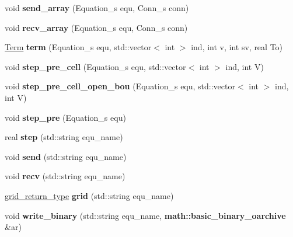 \begin{DoxyCompactItemize}
\item 
\hypertarget{classFace_afdbbc9947c0d7cd84b427bd7b503b15b}{void {\bfseries send\+\_\+array} (Equation\+\_\+s equ, Conn\+\_\+s conn)}\label{classFace_afdbbc9947c0d7cd84b427bd7b503b15b}

\item 
\hypertarget{classFace_a57bdfcf1ebf5e208b611f98b7ddeca00}{void {\bfseries recv\+\_\+array} (Equation\+\_\+s equ, Conn\+\_\+s conn)}\label{classFace_a57bdfcf1ebf5e208b611f98b7ddeca00}

\item 
\hypertarget{classFace_aa827a7d26d1b90507bb4252830b3ecf5}{\hyperlink{structTerm}{Term} {\bfseries term} (Equation\+\_\+s equ, std\+::vector$<$ int $>$ ind, int v, int sv, real To)}\label{classFace_aa827a7d26d1b90507bb4252830b3ecf5}

\item 
\hypertarget{classFace_aba0d776b0f0e7cceee8729825347b5cc}{void {\bfseries step\+\_\+pre\+\_\+cell} (Equation\+\_\+s equ, std\+::vector$<$ int $>$ ind, int V)}\label{classFace_aba0d776b0f0e7cceee8729825347b5cc}

\item 
\hypertarget{classFace_a2bafbcce9f57fd3bdefd9f23a62c853d}{void {\bfseries step\+\_\+pre\+\_\+cell\+\_\+open\+\_\+bou} (Equation\+\_\+s equ, std\+::vector$<$ int $>$ ind, int V)}\label{classFace_a2bafbcce9f57fd3bdefd9f23a62c853d}

\item 
\hypertarget{classFace_a8af2298846b8a666332f00de91796844}{void {\bfseries step\+\_\+pre} (Equation\+\_\+s equ)}\label{classFace_a8af2298846b8a666332f00de91796844}

\item 
\hypertarget{classFace_a62a7d504c1e99dfc928b7e27b544893b}{real {\bfseries step} (std\+::string equ\+\_\+name)}\label{classFace_a62a7d504c1e99dfc928b7e27b544893b}

\item 
\hypertarget{classFace_a781b3843f33507116afa741579317e83}{void {\bfseries send} (std\+::string equ\+\_\+name)}\label{classFace_a781b3843f33507116afa741579317e83}

\item 
\hypertarget{classFace_a4c67c45fa975e6fb3bc3d4ee0fa6a25f}{void {\bfseries recv} (std\+::string equ\+\_\+name)}\label{classFace_a4c67c45fa975e6fb3bc3d4ee0fa6a25f}

\item 
\hypertarget{classFace_aed123d42810d7a8f586d0229fbad2f75}{\hyperlink{structgrid__return__type}{grid\+\_\+return\+\_\+type} {\bfseries grid} (std\+::string equ\+\_\+name)}\label{classFace_aed123d42810d7a8f586d0229fbad2f75}

\item 
\hypertarget{classFace_aa79a5f4cab8cc5bfb2c35923aa488cb7}{void {\bfseries write\+\_\+binary} (std\+::string equ\+\_\+name, {\bf math\+::basic\+\_\+binary\+\_\+oarchive} \&ar)}\label{classFace_aa79a5f4cab8cc5bfb2c35923aa488cb7}

\end{DoxyCompactItemize}
